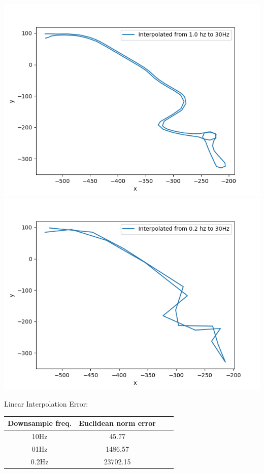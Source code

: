 \documentclass[10pt,letterpaper]{article}
\theoremstyle{definition}
\theoremstyle{remark}
\begin{document}
\begin{enumerate}[leftmargin=*,itemsep=9ex]
\begin{enumerate}[1., itemsep=5ex]
\begin{enumerate}[itemsep=5ex]
\begin{center}
        \includegraphics[width=0.32\linewidth]{fig/lin_01.png}
        \includegraphics[width=0.32\linewidth]{fig/lin_P2.png}
      \end{center}
      Linear Interpolation Error:
      \begin{center}
        \begin{tabular}{ |c|c|c|c| } 
        \hline
        \bf{Downsample freq.} & \bf{Euclidean norm error} \\
        \hline
        10Hz & 45.77 \\ 
        01Hz & 1486.57\\ 
        0.2Hz& 23702.15\\ 
        \hline
        \end{tabular}
      \end{center}
      

\end{enumerate}
\end{enumerate}
\end{enumerate}
\end{document}
